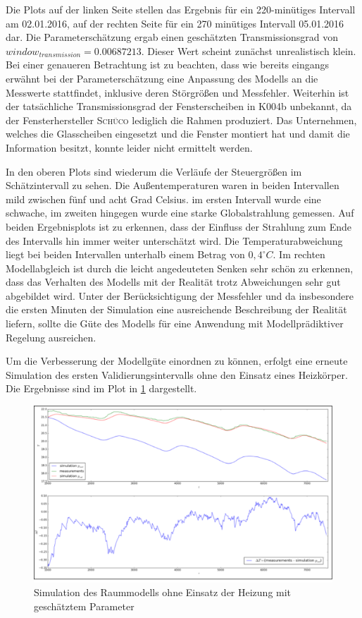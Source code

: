 Die Plots auf der linken Seite stellen das Ergebnis für ein 220-minütiges Intervall am 02.01.2016, auf der rechten Seite für ein 270 minütiges Intervall 05.01.2016 dar. Die Parameterschätzung ergab einen geschätzten Transmissionsgrad von $window_{transmission}=0.00687213$. Dieser Wert scheint zunächst unrealistisch klein. Bei einer genaueren Betrachtung ist zu beachten, dass wie bereits eingangs erwähnt bei der Parameterschätzung eine Anpassung des Modells an die Messwerte stattfindet, inklusive deren Störgrößen und Messfehler. Weiterhin ist der tatsächliche Transmissionsgrad der Fensterscheiben in K004b unbekannt, da der Fensterhersteller \textsc{Schüco} lediglich die Rahmen produziert. Das Unternehmen, welches die Glasscheiben eingesetzt und die Fenster montiert hat und damit die Information besitzt, konnte leider nicht ermittelt werden.

In den oberen Plots sind wiederum die Verläufe der Steuergrößen im Schätzintervall zu sehen. Die Außentemperaturen waren in beiden Intervallen mild zwischen fünf und acht Grad Celsius. im ersten Intervall wurde eine schwache, im zweiten hingegen wurde eine starke Globalstrahlung gemessen. Auf beiden Ergebnisplots ist zu erkennen, dass der Einfluss der Strahlung zum Ende des Intervalls hin immer weiter unterschätzt wird. Die Temperaturabweichung liegt bei beiden Intervallen unterhalb einem Betrag von $0,4^{\circ}C$. Im rechten Modellabgleich ist durch die leicht angedeuteten Senken sehr schön zu erkennen, dass das Verhalten des Modells mit der Realität trotz Abweichungen sehr gut abgebildet wird.
Unter der Berücksichtigung der Messfehler und da insbesondere die ersten Minuten der Simulation eine ausreichende Beschreibung der Realität liefern, sollte die Güte des Modells für eine Anwendung mit Modellprädiktiver Regelung ausreichen. 


Um die Verbesserung der Modellgüte einordnen zu können, erfolgt eine erneute Simulation des ersten Validierungsintervalls ohne den Einsatz eines Heizkörper. Die Ergebnisse sind im Plot in \ref{fig:valid1pe} dargestellt.

\begin{figure}
\centering
\includegraphics[width=\textwidth]{abbildungen/20160329_validierung1pe}
\caption{Simulation des Raummodells ohne Einsatz der Heizung mit geschätztem Parameter}
\label{fig:valid1pe}
\end{figure}

